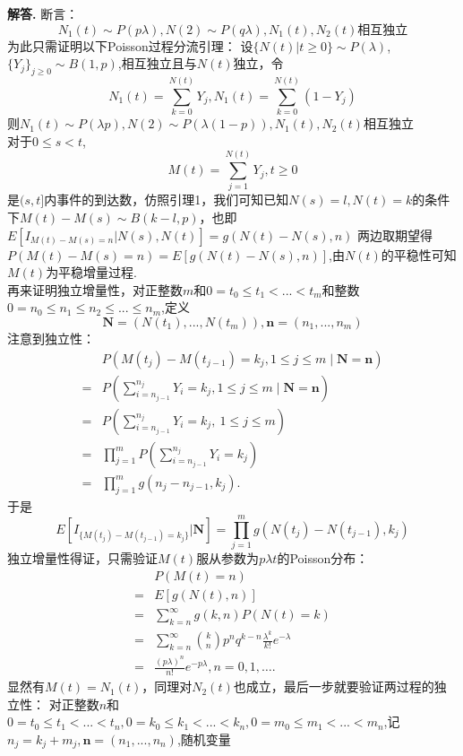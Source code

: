 \documentclass[12pt, a4paper, oneside]{ctexart}
\newenvironment{solution}{\par\noindent\textbf{解答. }}{\par}
\begin{document}
	\begin{solution}
	断言：\\
	$$N_1(t)\sim P(p\lambda),N(2)\sim P(q\lambda),N_1(t),N_2(t)\text{相互独立}$$
	为此只需证明以下Poisson过程分流引理：
	设$\{N(t)|t\geq 0\} \sim P(\lambda)$,$\{Y_j\}_{j\geq 0}\sim B(1,p)$,相互独立且与$N(t)$独立，令\\
	$$N_1(t)=\sum_{k=0}^{N(t)}Y_j,N_1(t)=\sum_{k=0}^{N(t)}(1-Y_j)$$则$N_1(t)\sim P(\lambda p),N(2)\sim P(\lambda(1-p)),N_1(t),N_2(t)\text{相互独立}$\\
	对于$0\le s <t$,$$M(t)=\sum_{j=1}^{N(t)}Y_j,t\ge 0$$
	是$(s,t]$内事件的到达数，仿照引理1，我们可知已知$N(s)=l,N(t)=k$的条件下$M(t)-M(s)\sim B(k-l,p)$，也即$E[I_{M(t)-M(s)=n}|N(s),N(t)]=g(N(t)-N(s),n)$
	两边取期望得$P({M(t)-M(s)=n})=E[g(N(t)-N(s),n)]$,由${N(t)}$的平稳性可知$M(t)$为平稳增量过程.\\
	再来证明独立增量性，对正整数$m$和$0=t_0\le t_1<...< t_m$和整数$0=n_0\le n_1\le n_2 \le ...\le n_m$,定义$$\mathbf{N}=(N(t_1),...,N(t_m)),\mathbf{n}=(n_1,...,n_m)$$
	注意到独立性：\\
	$$\begin{aligned}
		&P(M(t_j)-M(t_{j-1})=k_j, 1\leq j\leq m\mid\boldsymbol{N}=\boldsymbol{n}) \\
		=& P\left(\sum_{i=n_{j-1}}^{n_j}Y_i=k_j, 1\leq j\leq m\mid\boldsymbol{N}=\boldsymbol{n}\right) \\
		=& P\left(\sum_{i=n_{j-1}}^{n_{j}}Y_{i}=k_{j},~1\leq j\leq m\right) \\
		=& \prod_{j=1}^mP\left(\sum_{i=n_{j-1}}^{n_j}Y_i=k_j\right) \\
		=&\prod_{j=1}^mg(n_j-n_{j-1},k_j).
	\end{aligned}$$
	于是\\
	$$E[I_{\{M(t_j)-M(t_{j-1})=k_j\}}|\mathbf{N}]=\prod_{j=1}^mg(N(t_j)-N(t_{j-1}),k_j)$$
	独立增量性得证，只需验证$M(t)$服从参数为$p\lambda t$的Poisson分布：
	$$\begin{aligned}
		&P(M(t)=n) \\
		=& E[g(N(t),n)] \\
		=& \sum_{k=n}^\infty g(k,n)P(N(t)=k) \\
		=&\sum_{k=n}^\infty\binom knp^nq^{k-n}\frac{\lambda^k}{k!}e^{-\lambda} \\
		=& \frac{(p\lambda)^n}{n!}e^{-p\lambda}, n=0,1,\ldots. 
	\end{aligned}$$
	显然有$M(t)=N_1(t)$，同理对$N_2(t)$也成立，最后一步就要验证两过程的独立性：
	对正整数$n$和$0=t_0\le t_1<...< t_n,0=k_0\le k_1<...< k_n,0=m_0\le m_1<...< m_n$,记$n_j=k_j+m_j,\mathbf{n}=(n_1,...,n_n)$,随机变量\\

\end{solution}
\end{document}

